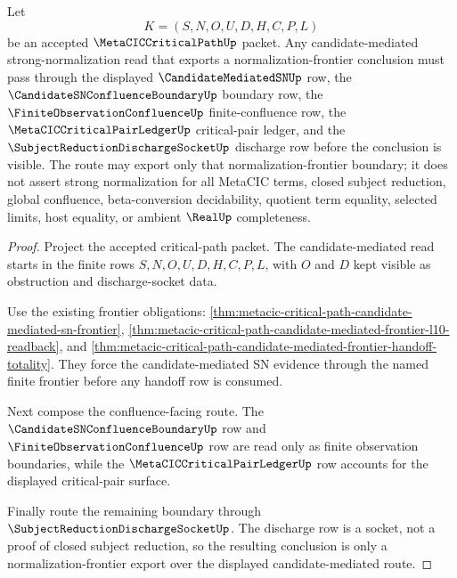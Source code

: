 \begin{theorem}
\label{thm:metacic-criticalpath-candidate-mediated-sn-route}
Let
$$
K=(S,N,O,U,D,H,C,P,L)
$$
be an accepted $\MetaCICCriticalPathUp$ packet. Any candidate-mediated strong-normalization read that exports a normalization-frontier conclusion must pass through the displayed $\CandidateMediatedSNUp$ row, the $\CandidateSNConfluenceBoundaryUp$ boundary row, the $\FiniteObservationConfluenceUp$ finite-confluence row, the $\MetaCICCriticalPairLedgerUp$ critical-pair ledger, and the $\SubjectReductionDischargeSocketUp$ discharge row before the conclusion is visible. The route may export only that normalization-frontier boundary; it does not assert strong normalization for all MetaCIC terms, closed subject reduction, global confluence, beta-conversion decidability, quotient term equality, selected limits, host equality, or ambient $\RealUp$ completeness.
\end{theorem}
\begin{proof}
Project the accepted critical-path packet. The candidate-mediated read starts in the finite rows $S,N,O,U,D,H,C,P,L$, with $O$ and $D$ kept visible as obstruction and discharge-socket data.

Use the existing frontier obligations: \autoref{thm:metacic-critical-path-candidate-mediated-sn-frontier}, \autoref{thm:metacic-critical-path-candidate-mediated-frontier-l10-readback}, and \autoref{thm:metacic-critical-path-candidate-mediated-frontier-handoff-totality}. They force the candidate-mediated SN evidence through the named finite frontier before any handoff row is consumed.

Next compose the confluence-facing route. The $\CandidateSNConfluenceBoundaryUp$ row and $\FiniteObservationConfluenceUp$ row are read only as finite observation boundaries, while the $\MetaCICCriticalPairLedgerUp$ row accounts for the displayed critical-pair surface.

Finally route the remaining boundary through $\SubjectReductionDischargeSocketUp$. The discharge row is a socket, not a proof of closed subject reduction, so the resulting conclusion is only a normalization-frontier export over the displayed candidate-mediated route.
\end{proof}

